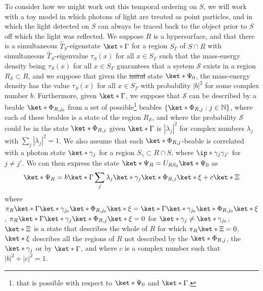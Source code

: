 \documentclass[12pt]{report}
\providecommand{\DIFadd}[1]{{\protect\color{blue}\uwave{#1}}} %
\providecommand{\DIFdel}[1]{{\protect\color{red}\sout{#1}}}                      %
\providecommand{\DIFaddbegin}{} %
\providecommand{\DIFaddend}{} %
\providecommand{\DIFdelbegin}{} %
\providecommand{\DIFdelend}{} %
\begin{document}
To consider how we might work out this temporal ordering on $S$, we will work with a toy model in which photons of light are treated as point particles, and in which the light detected on $S$ can always be traced back to the object prior to $S$ off which the light was reflected. We suppose $R$ is a hypersurface, and that there is a simultaneous $\hat{T}_S$-eigenstate $\ket*{\Gamma}$ for a region $S_{\Gamma}$ of $S\cap R$ with simultaneous $\hat{T}_S$-eigenvalue $\tau_S(x)$ for all $x\in S_{\Gamma}$ such that the mass-energy density being $\tau_S(x)$ for all $x\in S_\Gamma$ guarantees that a system $\mathcal{S}$ exists in a region $R_{\mathcal{S}}\subset R$, and we suppose that given the \DIFdelbegin \DIFdel{inital }\DIFdelend \DIFaddbegin \DIFadd{initial }\DIFaddend state $\ket*{\Psi_0}$, the mass-energy density has the value $\tau_S(x)$ for all $x\in S_\Gamma$ with probability $|b|^2$ for some complex number $b$. Furthermore, given $\ket*{\Gamma}$, we suppose that  $\mathcal{S}$ can be described by a beable $\ket*{\Phi_{R, j_0}}$ from a set of possible\footnote{that is possible with respect to $\ket*{\Psi_0}$ and $\ket*{\Gamma}$.} beables $\{ \ket*{\Phi_{R, j}}: j\in \mathbb{N}\}$, where each of these beables is a state of the region $R_{\mathcal{S}}$, and where the probability $\mathcal{S}$ could be in the state $\ket*{\Phi_{R, j}}$ given $\ket*{\Gamma}$ is $|\lambda_j|^2$ for complex numbers $\lambda_j$ with $\sum_j|\lambda_j|^2=1$. We also assume that each $\ket*{\Phi_{R, j}}$-beable is correlated with a photon state $\ket*{\gamma_{j}}$ for a region $S_{\gamma}\subset R\cap S$, where $\ip*{\gamma_{j}}{\gamma_{j'}}$ for $j\neq j'$. We can then express the state $\ket*{\Psi_R}=U_{RS_0}\ket*{\Psi_0}$ as 
\begin{equation}
\ket*{\Psi_R}=b\ket*{\Gamma}\sum_j \lambda_j \ket*{\gamma_{j}}\ket*{\Phi_{R, j}}\ket*{\xi}+c\ket*{\Xi}
\end{equation}
where $\pi_R\ket*{\Gamma}\ket*{\gamma_{j_0}}\ket*{\Phi_{R,j_0}}\ket*{\xi}=\ket*{\Gamma}\ket*{\gamma_{j_0}}\ket*{\Phi_{R,j_0}}\ket*{\xi}$,  
$\pi_R\ket*{\Gamma}\ket*{\gamma_{j}}\ket*{\Phi_{R,j}}\ket*{\xi}=0$
for $\ket*{\gamma_{j}}\neq \ket*{\gamma_{j_0}}$, 
$\ket*{\Xi}$ is  a state that describes the whole of $R$ for which $\pi_R\ket*{\Xi}=0$, $\ket*{\xi}$ describes all the regions of $R$ not described by the $\ket*{\Phi_{R,j}}$, the $\ket*{\gamma_{j}}$ or by $\ket*{\Gamma}$, and where $c$ is a complex number such that $|b|^2+|c|^2=1$.
\end{document}
